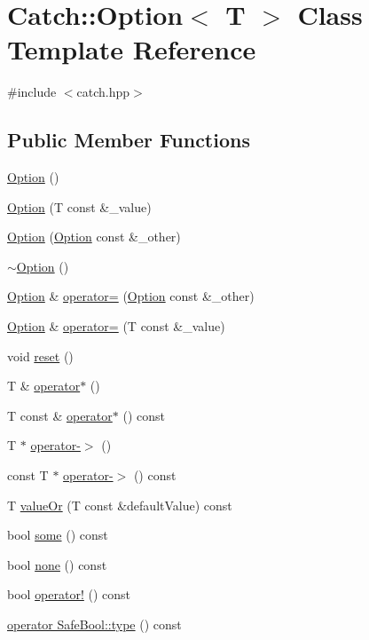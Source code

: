 \hypertarget{classCatch_1_1Option}{\section{Catch\-:\-:Option$<$ T $>$ Class Template Reference}
\label{classCatch_1_1Option}
}


{\ttfamily \#include $<$catch.\-hpp$>$}

\subsection*{Public Member Functions}
\begin{DoxyCompactItemize}
\item 
\hyperlink{classCatch_1_1Option_a8efb01b593d798decc80cbbdf311f2a3}{Option} ()
\item 
\hyperlink{classCatch_1_1Option_a5aeb9c22d48a6882bdf5fb4730b06c86}{Option} (T const \&\-\_\-value)
\item 
\hyperlink{classCatch_1_1Option_af02f2e4559f06384baec0def8c68c5fd}{Option} (\hyperlink{classCatch_1_1Option}{Option} const \&\-\_\-other)
\item 
\hyperlink{classCatch_1_1Option_a37fe90bb47bb909f150a5ad6be25581a}{$\sim$\-Option} ()
\item 
\hyperlink{classCatch_1_1Option}{Option} \& \hyperlink{classCatch_1_1Option_a78c65b15dd6b2fbd04c5012c43017c8f}{operator=} (\hyperlink{classCatch_1_1Option}{Option} const \&\-\_\-other)
\item 
\hyperlink{classCatch_1_1Option}{Option} \& \hyperlink{classCatch_1_1Option_a2be7e343ab22d6061726d32ab4622653}{operator=} (T const \&\-\_\-value)
\item 
void \hyperlink{classCatch_1_1Option_a37b4e0e5d4d56296adacd267a616f4e0}{reset} ()
\item 
T \& \hyperlink{classCatch_1_1Option_afd989852fa453731c3190dac63caccb0}{operator$\ast$} ()
\item 
T const \& \hyperlink{classCatch_1_1Option_a0f05708905dc6b0b470fb24f5d265631}{operator$\ast$} () const 
\item 
T $\ast$ \hyperlink{classCatch_1_1Option_acad340798a16c8f700f8763119e90f31}{operator-\/$>$} ()
\item 
const T $\ast$ \hyperlink{classCatch_1_1Option_a0800340b2971748671b88acfb14bb928}{operator-\/$>$} () const 
\item 
T \hyperlink{classCatch_1_1Option_a21b5629a7febbe3e23c475c9d9138a2d}{value\-Or} (T const \&default\-Value) const 
\item 
bool \hyperlink{classCatch_1_1Option_affa96f15798b4656fb753ff52d12dec2}{some} () const 
\item 
bool \hyperlink{classCatch_1_1Option_a389324d2aa20ceb0eb0f48a5f77c20c8}{none} () const 
\item 
bool \hyperlink{classCatch_1_1Option_a47a1b6f6def2730ea9d27a1860a4f97f}{operator!} () const 
\item 
\hyperlink{classCatch_1_1Option_a637d4366ae7f0ded52ce59c8cb06da7b}{operator Safe\-Bool\-::type} () const 
\end{DoxyCompactItemize}


